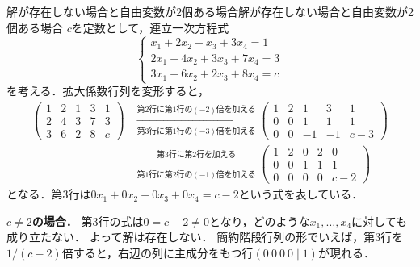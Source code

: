 \begin{example}{解が存在しない場合と自由変数が$2$個ある場合}{解が存在しない場合と自由変数が2個ある場合}
  $c$を定数として，連立一次方程式
  \[
    \begin{cases}
      x_1 + 2x_2 + x_3 + 3x_4 = 1 \\
      2x_1 + 4x_2 + 3x_3 + 7x_4 = 3 \\
      3x_1 + 6x_2 + 2x_3 + 8x_4 = c
    \end{cases}
  \]
  を考える．拡大係数行列を変形すると，
  \begin{align*}
    \left(
    \begin{array}{cccc|c}
      1 & 2 & 1 & 3 & 1 \\
      2 & 4 & 3 & 7 & 3 \\
      3 & 6 & 2 & 8 & c
    \end{array}
    \right)
    &\xrightarrow[\text{第3行に第1行の$(-3)$倍を加える}]{\text{第2行に第1行の$(-2)$倍を加える}}
    \left(
    \begin{array}{cccc|c}
      1 & 2 & 1 & 3 & 1 \\
      0 & 0 & 1 & 1 & 1 \\
      0 & 0 & -1 & -1 & c - 3
    \end{array}
    \right) \\
    &\xrightarrow[\text{第1行に第2行の$(-1)$倍を加える}]{\text{第3行に第2行を加える}}
    \left(
    \begin{array}{cccc|c}
      1 & 2 & 0 & 2 & 0 \\
      0 & 0 & 1 & 1 & 1 \\
      0 & 0 & 0 & 0 & c - 2
    \end{array}
    \right)
  \end{align*}
  となる．第$3$行は$0x_1 + 0x_2 + 0x_3 + 0x_4 = c - 2$という式を表している．

  \textbf{$c \ne 2$の場合．}
  第$3$行の式は$0 = c - 2 \ne 0$となり，どのような$x_1, \dots, x_4$に対しても成り立たない．
  よって解は存在しない．
  簡約階段行列の形でいえば，第$3$行を$1/(c - 2)$倍すると，右辺の列に主成分をもつ行$(0~0~0~0 \mid 1)$が現れる．


\end{example}
